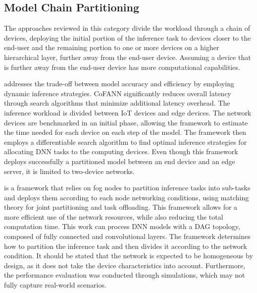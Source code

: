 \subsection{Model Chain Partitioning} \label{sec:se312}

The approaches reviewed in this category divide the workload through a chain of 
devices, deploying the initial portion of the inference task to devices closer to 
the end-user and the remaining portion to one or more devices on a higher 
hierarchical layer, further away from the end-user device. Assuming a device
that is further away from the end-user device has more computational capabilities.

\begin{description}[style=unboxed, leftmargin=1cm, font=\bfseries]

    \item [CoFANN \cite{tran-van_cofann_2025}]
    addresses the trade-off between model accuracy and efficiency by employing
    dynamic inference strategies. CoFANN significantly reduces overall latency
    through search algorithms that minimize additional latency overhead. The 
    inference workload is divided between \ac{IoT} devices and edge devices.
    The network devices are benchmarked in an initial phase, allowing the 
    framework to estimate the time needed for each device on each step of the 
    model. The framework then employs a differentiable search algorithm 
    to find optimal inference strategies for allocating \ac{DNN} tasks to the 
    computing devices. Even though this framework deploys successfully a
    partitioned model between an end device and an edge server, it is limited
    to two-device networks.  

    \item[DINA \cite{t_mohammed_distributed_2020}]
    is a framework that relies on fog nodes to partition inference tasks into
    sub-tasks and deploys them according to each node networking conditions, using
    matching theory for joint partitioning and task offloading. This framework 
    allows for a more efficient use of the network resources, while also 
    reducing the total computation time.
    This work can process \ac{DNN} models with a \ac{DAG} topology, composed of 
    fully connected and convolutional layers. The framework determines how to 
    partition the inference task and then divides it according to the network 
    condition. It should be stated that the network is expected to be homogeneous
    by design, as it does not take the device characteristics into account.
    Furthermore, the performance evaluation was conducted through simulations, 
    which may not fully capture real-world scenarios.
    


\end{description}
